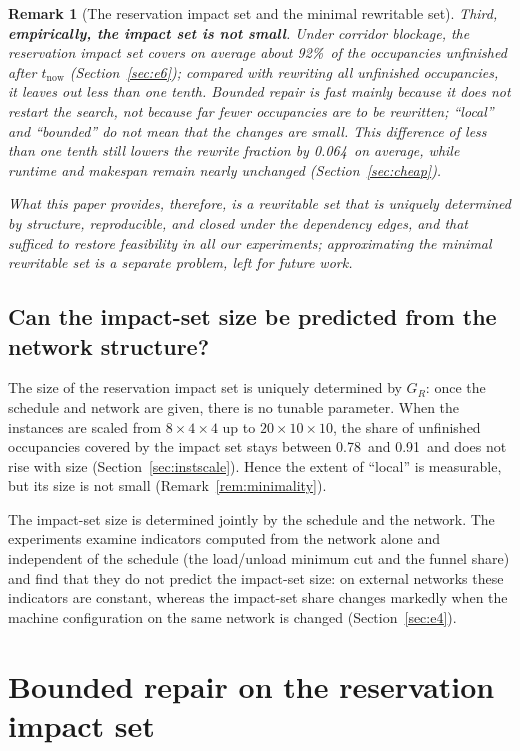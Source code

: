 \documentclass[manuscript,screen,review]{acmart}
\newcommand{\ClosureAliveFrac}{92\%}
\newcommand{\RAStabMean}{0.064}      %
\newcommand{\ScaleJobsHi}{20}
\newcommand{\ScaleMachHi}{10}
\newcommand{\ScaleCloAliveLo}{0.78}  %
\newcommand{\ScaleCloAliveHi}{0.91}  %
\newtheorem{remark}{Remark}
\begin{document}
\begin{remark}[The reservation impact set and the minimal rewritable set]
Third, \textbf{empirically, the impact set is not small}. Under corridor blockage, the reservation impact set covers on average about \ClosureAliveFrac\ of the occupancies
unfinished after \(t_{\mathrm{now}}\) (Section~\ref{sec:e6}); compared with rewriting all unfinished occupancies, it leaves out less than one tenth.
Bounded repair is fast mainly because it does not restart the search, not because far fewer occupancies are to be rewritten; ``local'' and ``bounded'' do not mean that the changes are small.
This difference of less than one tenth still lowers the rewrite fraction by \RAStabMean\ on average, while runtime and makespan remain nearly unchanged (Section~\ref{sec:cheap}).

What this paper provides, therefore, is a rewritable set that is uniquely determined by structure, reproducible, and closed under the dependency edges,
and that sufficed to restore feasibility in all our experiments; approximating the minimal rewritable set is a separate problem, left for future work.
\end{remark}

\subsection{Can the impact-set size be predicted from the network structure?}
\label{sec:structure}

The size of the reservation impact set is uniquely determined by \(G_R\): once the schedule and network are given, there is no tunable parameter.
When the instances are scaled from \(8\times4\times4\) up to \(\ScaleJobsHi\times\ScaleMachHi\times\ScaleMachHi\),
the share of unfinished occupancies covered by the impact set stays between \ScaleCloAliveLo\ and \ScaleCloAliveHi\ and does not rise with size (Section~\ref{sec:instscale}).
Hence the extent of ``local'' is measurable, but its size is not small (Remark~\ref{rem:minimality}).

The impact-set size is determined jointly by the schedule and the network. The experiments examine indicators computed from the network alone and independent of the schedule
(the load/unload minimum cut and the funnel share) and find that they do not predict the impact-set size: on external networks these indicators are constant,
whereas the impact-set share changes markedly when the machine configuration on the same network is changed (Section~\ref{sec:e4}).

\section{Bounded repair on the reservation impact set}
\label{sec:repair}
\end{document}
